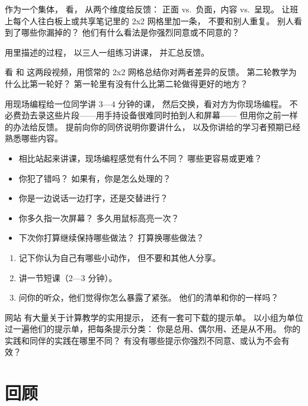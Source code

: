 
作为一个集体，
看，
从两个维度给反馈：
正面 vs.\ 负面，内容 vs.\ 呈现。
让班上每个人往白板上或共享笔记里的 2x2 网格里加一条，
不要和别人重复。
别人看到了哪些你漏掉的？
他们有什么看法是你强烈同意或不同意的？


用里描述的过程，
以三人一组练习讲课，
并汇总反馈。


看
和
这两段视频，用惯常的 2x2 网格总结你对两者差异的反馈。
第二轮教学为什么比第一轮好？
第一轮里有没有什么比第二轮做得更好的地方？


用现场编程给一位同学讲 3—4 分钟的课，
然后交换，看对方为你现场编程。
不必费劲去录这些片段——用手持设备很难同时拍到人和屏幕——
但用你之前一样的办法给反馈。
提前向你的同侪说明你要讲什么，
以及你讲给的学习者预期已经熟悉哪些内容。

\begin{itemize}

\item
  相比站起来讲课，现场编程感觉有什么不同？
  哪些更容易或更难？

\item
  你犯了错吗？
  如果有，你是怎么处理的？

\item
  你是一边说话一边打字，还是交替进行？

\item
  你多久指一次屏幕？
  多久用鼠标高亮一次？

\item
  下次你打算继续保持哪些做法？
  打算换哪些做法？

\end{itemize}


\begin{enumerate}

\item
  记下你认为自己有哪些小动作，
  但不要和其他人分享。

\item
  讲一节短课（2—3 分钟）。

\item
  问你的听众，他们觉得你怎么暴露了紧张。
  他们的清单和你的一样吗？

\end{enumerate}


 网站
有大量关于计算教学的实用提示，
还有一套可下载的提示单。
以小组为单位过一遍他们的提示单，把每条提示分类：
你是总用、偶尔用、还是从不用。
你的实践和同伴的实践在哪里不同？
有没有哪些提示你强烈不同意、或认为不会有效？

\section*{回顾}

